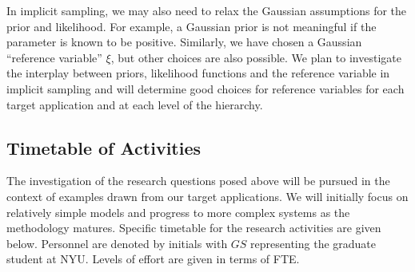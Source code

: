 \documentclass[11pt]{article}
\newcommand{\MarginPar}[1]{\marginpar{%
\vskip-\baselineskip %
\raggedright\tiny\sffamily
\hrule\smallskip{\color{red}#1}\par\smallskip\hrule}}
\begin{document}
In implicit sampling, we may also need to relax the Gaussian assumptions for the prior and likelihood.
For example, a Gaussian prior is not meaningful if the parameter is known to be positive. Similarly, we have chosen a Gaussian ``reference variable'' $\xi$, but other choices are also possible. We plan to investigate the interplay between priors, likelihood functions and the reference variable in implicit sampling and will determine good choices for reference variables for each target application and at each level of the hierarchy.

\subsection*{Timetable of Activities}

The investigation of the research questions posed above will be pursued in the context of examples drawn from our target applications.
We will initially focus on relatively simple models and progress to more complex systems as the methodology matures.
Specific timetable for the research activities are given below.
Personnel are denoted by initials with $GS$ representing the graduate student at NYU. Levels of effort are given in terms of FTE.
%
\end{document}
